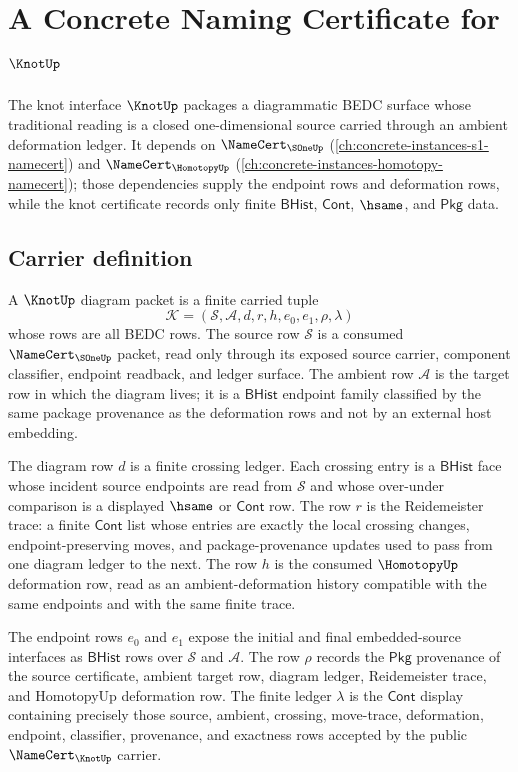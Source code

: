 \chapter{A Concrete Naming Certificate for $\KnotUp$}
\label{ch:concrete-instances-knot-namecert}

The knot interface $\KnotUp$ packages a diagrammatic BEDC surface whose traditional reading is a closed one-dimensional source carried through an ambient deformation ledger. It depends on $\NameCert_{\SOneUp}$ (\autoref{ch:concrete-instances-s1-namecert}) and $\NameCert_{\HomotopyUp}$ (\autoref{ch:concrete-instances-homotopy-namecert}); those dependencies supply the endpoint rows and deformation rows, while the knot certificate records only finite $\mathsf{BHist}$, $\mathsf{Cont}$, $\hsame$, and $\mathsf{Pkg}$ data.

\section{Carrier definition}
\label{sec:knot-carrier}

\begin{definition}
\label{def:knot-diagram-bhist-carrier}
A $\KnotUp$ diagram packet is a finite carried tuple
$$
\mathcal{K}=(\mathcal{S},\mathcal{A},d,r,h,e_0,e_1,\rho,\lambda)
$$
whose rows are all BEDC rows. The source row $\mathcal{S}$ is a consumed
$\NameCert_{\SOneUp}$ packet, read only through its exposed source carrier,
component classifier, endpoint readback, and ledger surface. The ambient row
$\mathcal{A}$ is the target row in which the diagram lives; it is a
$\mathsf{BHist}$ endpoint family classified by the same package provenance as
the deformation rows and not by an external host embedding.

The diagram row $d$ is a finite crossing ledger. Each crossing entry is a
$\mathsf{BHist}$ face whose incident source endpoints are read from
$\mathcal{S}$ and whose over-under comparison is a displayed $\hsame$ or
$\mathsf{Cont}$ row. The row $r$ is the Reidemeister trace: a finite
$\mathsf{Cont}$ list whose entries are exactly the local crossing changes,
endpoint-preserving moves, and package-provenance updates used to pass from
one diagram ledger to the next. The row $h$ is the consumed
$\HomotopyUp$ deformation row, read as an ambient-deformation history
compatible with the same endpoints and with the same finite trace.

The endpoint rows $e_0$ and $e_1$ expose the initial and final embedded-source
interfaces as $\mathsf{BHist}$ rows over $\mathcal{S}$ and $\mathcal{A}$. The
row $\rho$ records the $\mathsf{Pkg}$ provenance of the source certificate,
ambient target row, diagram ledger, Reidemeister trace, and HomotopyUp
deformation row. The finite ledger $\lambda$ is the $\mathsf{Cont}$ display
containing precisely those source, ambient, crossing, move-trace, deformation,
endpoint, classifier, provenance, and exactness rows accepted by the public
$\NameCert_{\KnotUp}$ carrier.
\end{definition}

